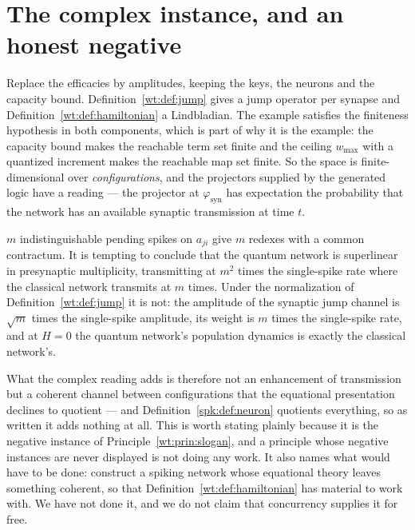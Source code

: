 \section{The complex instance, and an honest negative}

Replace the efficacies by amplitudes, keeping the keys, the neurons and the capacity
bound. Definition~\ref{wt:def:jump} gives a jump operator per synapse and
Definition~\ref{wt:def:hamiltonian} a Lindbladian. The example satisfies the finiteness
hypothesis in both components, which is part of why it is the example: the capacity bound
makes the reachable term set finite and the ceiling $w_{\max}$ with a quantized increment
makes the reachable map set finite. So the space is finite-dimensional over
\emph{configurations}, and the projectors supplied by the generated logic have a reading
--- the projector at $\varphi_{\mathrm{syn}}$ has expectation the probability that the
network has an available synaptic transmission at time $t$.

\begin{remark}
\label{spk:rmk:bosonic}
$m$ indistinguishable pending spikes on $a_{ji}$ give $m$ redexes with a common
contractum. It is tempting to conclude that the quantum network is superlinear in
presynaptic multiplicity, transmitting at $m^2$ times the single-spike rate where the
classical network transmits at $m$ times. Under the normalization of
Definition~\ref{wt:def:jump} it is not: the amplitude of the synaptic jump channel is
$\sqrt{m}$ times the single-spike amplitude, its weight is $m$ times the single-spike
rate, and at $H = 0$ the quantum network's population dynamics is exactly the classical
network's.

What the complex reading adds is therefore not an enhancement of transmission but a
coherent channel between configurations that the equational presentation declines to
quotient --- and Definition~\ref{spk:def:neuron} quotients everything, so as written it
adds nothing at all. This is worth stating plainly because it is the negative instance of
Principle~\ref{wt:prin:slogan}, and a principle whose negative instances are never
displayed is not doing any work. It also names what would have to be done: construct a
spiking network whose equational theory leaves something coherent, so that
Definition~\ref{wt:def:hamiltonian} has material to work with. We have not done it, and we
do not claim that concurrency supplies it for free.
\end{remark}

